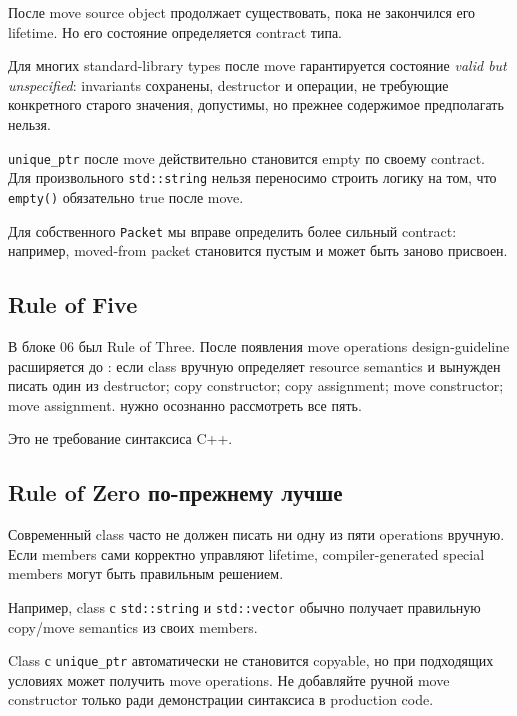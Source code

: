 После move source object продолжает существовать, пока не закончился его
lifetime. Но его состояние определяется contract типа.

Для многих standard-library types после move гарантируется состояние
\emph{valid but unspecified}: invariants сохранены, destructor и операции,
не требующие конкретного старого значения, допустимы, но прежнее содержимое
предполагать нельзя.

\begin{warningbox}
\texttt{unique\_ptr} после move действительно становится empty по своему
contract. Для произвольного \texttt{std::string} нельзя переносимо строить
логику на том, что \texttt{empty()} обязательно true после move.
\end{warningbox}

Для собственного \texttt{Packet} мы вправе определить более сильный contract:
например, moved-from packet становится пустым и может быть заново присвоен.

\subsection{Rule of Five}

В блоке 06 был Rule of Three. После появления move operations design-guideline
расширяется до : если class вручную определяет resource
semantics и вынужден писать один из
destructor; copy constructor; copy assignment; move constructor; move assignment.
нужно осознанно рассмотреть все пять.

Это не требование синтаксиса C++.

\subsection{Rule of Zero по-прежнему лучше}

Современный class часто не должен писать ни одну из пяти operations вручную.
Если members сами корректно управляют lifetime, compiler-generated special
members могут быть правильным решением.

Например, class с \texttt{std::string} и \texttt{std::vector} обычно получает
правильную copy/move semantics из своих members.

Class с \texttt{unique\_ptr} автоматически не становится copyable, но при
подходящих условиях может получить move operations. Не добавляйте ручной move
constructor только ради демонстрации синтаксиса в production code.


